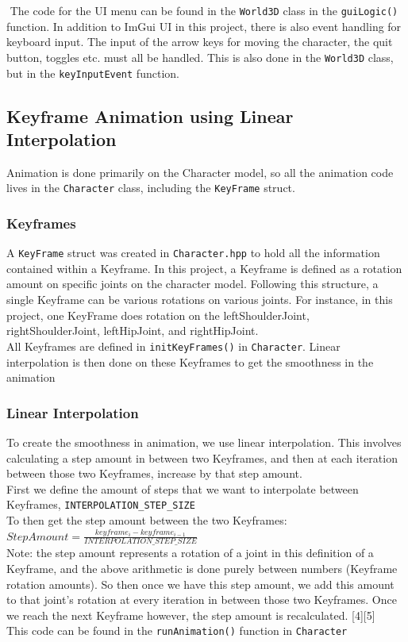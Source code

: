 \documentclass {article}
\begin{document}
$ $ \newline The code for the UI menu can be found in the \texttt{World3D} class in the \texttt{guiLogic()} function. In addition to ImGui UI in this project, there is also event handling for keyboard input. The input of the arrow keys for moving the character, the quit button, toggles etc. must all be handled. This is also done in the \texttt{World3D} class, but in the \texttt{keyInputEvent} function.

\subsection{Keyframe Animation using Linear Interpolation}
Animation is done primarily on the Character model, so all the animation code lives in the \texttt{Character} class, including the \texttt{KeyFrame} struct.
\subsubsection{Keyframes}
A \texttt{KeyFrame} struct was created in \texttt{Character.hpp} to hold all the information contained within a Keyframe. In this project, a Keyframe is defined as a rotation amount on specific joints on the character model. Following this structure, a single Keyframe can be various rotations on various joints. For instance, in this project, one KeyFrame does rotation on the leftShoulderJoint, rightShoulderJoint, leftHipJoint, and rightHipJoint.\\
All Keyframes are defined in \texttt{initKeyFrames()} in \texttt{Character}. Linear interpolation is then done on these Keyframes to get the smoothness in the animation

\subsubsection{Linear Interpolation}
To create the smoothness in animation, we use linear interpolation. This involves calculating a step amount in between two Keyframes, and then at each iteration between those two Keyframes, increase by that step amount.\\ \newline
First we define the amount of steps that we want to interpolate between Keyframes, \texttt{INTERPOLATION{\_}STEP{\_}SIZE} \\ 
To then get the step amount between the two Keyframes: \\ \newline
$StepAmount = \frac{keyframe_i - keyframe_{i-1}}{INTERPOLATION{\_}STEP{\_}SIZE}$ \\ \newline
Note: the step amount represents a rotation of a joint in this definition of a Keyframe, and the above arithmetic is done purely between numbers (Keyframe rotation amounts). So then once we have this step amount, we add this amount to that joint's rotation at every iteration in between those two Keyframes. Once we reach the next Keyframe however, the step amount is recalculated. [4][5]\\
This code can be found in the \texttt{runAnimation()} function in \texttt{Character} 
\end{document}

